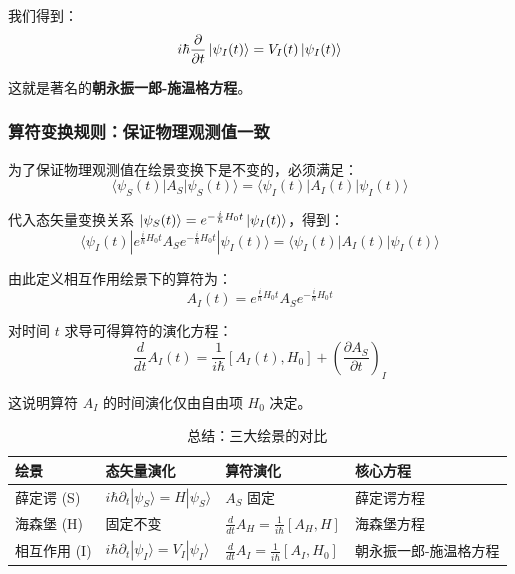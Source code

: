 我们得到：
\begin{equation}
	i\hbar \frac{\partial}{\partial t} \ket{\psi_I(t)} = V_I(t) \ket{\psi_I(t)}
\end{equation}

这就是著名的\textbf{朝永振一郎-施温格方程}。

\subsubsection{算符变换规则：保证物理观测值一致}
为了保证物理观测值在绘景变换下是不变的，必须满足：
\begin{equation}
	\langle \psi_S(t) | A_S | \psi_S(t) \rangle = \langle \psi_I(t) | A_I(t) | \psi_I(t) \rangle
\end{equation}

代入态矢量变换关系 $\ket{\psi_S(t)} = e^{-\frac{i}{\hbar} H_0 t} \ket{\psi_I(t)}$，得到：
\begin{equation}
	\langle \psi_I(t) | e^{\frac{i}{\hbar} H_0 t} A_S e^{-\frac{i}{\hbar} H_0 t} | \psi_I(t) \rangle = \langle \psi_I(t) | A_I(t) | \psi_I(t) \rangle
\end{equation}

由此定义相互作用绘景下的算符为：
\begin{equation}
	A_I(t) = e^{\frac{i}{\hbar} H_0 t} A_S e^{-\frac{i}{\hbar} H_0 t}
\end{equation}

对时间 $t$ 求导可得算符的演化方程：
\begin{equation}
	\frac{d}{dt} A_I(t) = \frac{1}{i\hbar} [A_I(t), H_0] + \left( \frac{\partial A_S}{\partial t} \right)_I
\end{equation}

这说明算符 $A_I$ 的时间演化仅由自由项 $H_0$ 决定。
\begin{table}[h!]
	\caption{总结：三大绘景的对比}
	\centering
	\begin{tabular}{@{}llll@{}}
		\toprule
		绘景 & 态矢量演化 & 算符演化 & 核心方程 \\ \midrule
		薛定谔 (S) & $i\hbar \partial_t |\psi_S\rangle = H |\psi_S\rangle$ & $A_S$ 固定 & 薛定谔方程 \\
		海森堡 (H) & 固定不变 & $\frac{d}{dt}A_H = \frac{1}{i\hbar}[A_H, H]$ & 海森堡方程 \\
		相互作用 (I) & $i\hbar \partial_t |\psi_I\rangle = V_I |\psi_I\rangle$ & $\frac{d}{dt}A_I = \frac{1}{i\hbar}[A_I, H_0]$ & 朝永振一郎-施温格方程 \\ \bottomrule
	\end{tabular}
\end{table}

